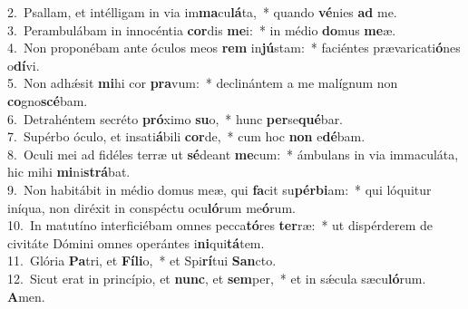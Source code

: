 {2.~}Psallam, et intélligam in via im\textbf{ma}cu\textbf{lá}ta,~* quando \textbf{vé}nies \textbf{ad} me.\\
{3.~}Perambulábam in innocéntia \textbf{cor}dis \textbf{me}i:~* in médio \textbf{do}mus \textbf{me}æ.\\
{4.~}Non proponébam ante óculos meos \textbf{rem} in\textbf{jú}stam:~* faciéntes prævaricati\textbf{ó}nes o\textbf{dí}vi.\\
{5.~}Non adhǽsit \textbf{mi}hi cor \textbf{pra}vum:~* declinántem a me malígnum non \textbf{co}gno\textbf{scé}bam.\\
{6.~}Detrahéntem secréto \textbf{pró}ximo \textbf{su}o,~* hunc \textbf{per}se\textbf{qué}bar.\\
{7.~}Supérbo óculo, et insati\textbf{á}bili \textbf{cor}de,~* cum hoc \textbf{non} e\textbf{dé}bam.\\
{8.~}Oculi mei ad fidéles terræ ut \textbf{sé}deant \textbf{me}cum:~* ámbulans in via immaculáta, hic mihi \textbf{mi}ni\textbf{strá}bat.\\
{9.~}Non habitábit in médio domus meæ, qui \textbf{fa}cit su\textbf{pér}\textbf{bi}am:~* qui lóquitur iníqua, non diréxit in conspéctu ocu\textbf{ló}rum me\textbf{ó}rum.\\
{10.~}In matutíno interficiébam omnes pecca\textbf{tó}res \textbf{ter}ræ:~* ut dispérderem de civitáte Dómini omnes operántes i\textbf{ni}qui\textbf{tá}tem.\\
{11.~}Glória \textbf{Pa}tri, et \textbf{Fí}\textbf{li}o,~* et Spi\textbf{rí}tui \textbf{San}cto.\\
{12.~}Sicut erat in princípio, et \textbf{nunc}, et \textbf{sem}per,~* et in sǽcula sæcu\textbf{ló}rum. \textbf{A}men.\\
